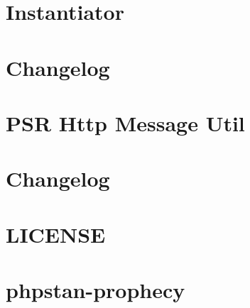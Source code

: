 \documentclass[twoside]{book}
\newcommand{\+}{\discretionary{\mbox{\scriptsize$\hookleftarrow$}}{}{}}
\begin{document}
\chapter{Instantiator}
\label{md__c__workspace__proyecto__p_h_p_project_vendor_doctrine_instantiator__r_e_a_d_m_e}

\chapter{Changelog}
\label{md__c__workspace__proyecto__p_h_p_project_vendor_fig_http_message_util__c_h_a_n_g_e_l_o_g}

\chapter{PSR Http Message Util}
\label{md__c__workspace__proyecto__p_h_p_project_vendor_fig_http_message_util__r_e_a_d_m_e}

\chapter{Changelog}
\label{md__c__workspace__proyecto__p_h_p_project_vendor_jangregor_phpstan_prophecy__c_h_a_n_g_e_l_o_g}

\chapter{LICENSE}
\label{md__c__workspace__proyecto__p_h_p_project_vendor_jangregor_phpstan_prophecy__l_i_c_e_n_s_e}

\chapter{phpstan-\/prophecy}
\label{md__c__workspace__proyecto__p_h_p_project_vendor_jangregor_phpstan_prophecy__r_e_a_d_m_e}

\end{document}
